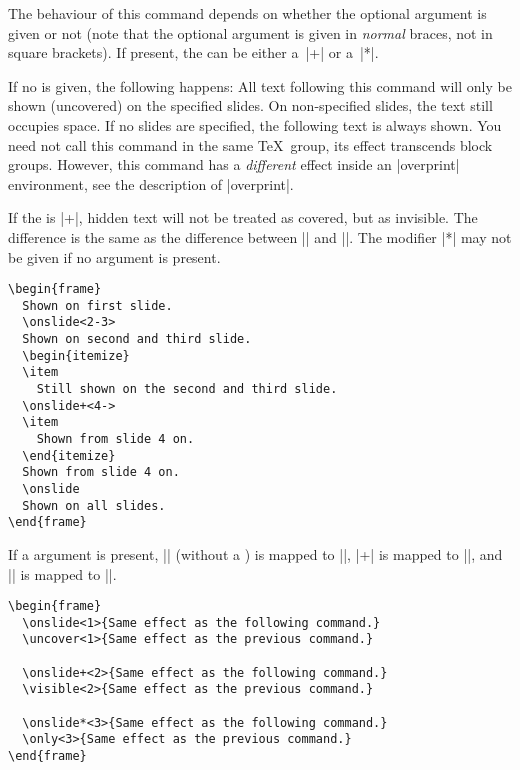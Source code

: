 \begin{command}{\onslide{}}
  The behaviour of this command depends on whether the optional
  argument  is given or not (note that the optional
  argument is given in \emph{normal} braces, not in square
  brackets). If present, the  can be either a~|+| or
  a~|*|.

  If no  is given, the following happens: All text
  following this command will only be shown  (uncovered) on the
  specified slides. On non-specified slides, the text still
  occupies space. If no slides are specified, the following
  text is always shown. You need not call this command in the same
  \TeX\ group, its effect transcends block groups. However, this
  command has a \emph{different} effect inside an |overprint|
  environment, see the description of |overprint|.

  If the  is |+|, hidden text will not be treated
  as covered, but as invisible. The difference is the same as the
  difference between |\uncover| and |\visible|. The modifier |*| may
  not be given if no  argument is present.

  \example
\begin{verbatim}
\begin{frame}
  Shown on first slide.
  \onslide<2-3>
  Shown on second and third slide.
  \begin{itemize}
  \item
    Still shown on the second and third slide.
  \onslide+<4->
  \item
    Shown from slide 4 on.
  \end{itemize}
  Shown from slide 4 on.
  \onslide
  Shown on all slides.
\end{frame}
\end{verbatim}

  If a  argument is present, |\onslide| (without a
  ) is mapped to |\uncover|, |\onslide+|
  is mapped to |\visible|, and |\onslide*| is mapped to |\only|.

  \example
\begin{verbatim}
\begin{frame}
  \onslide<1>{Same effect as the following command.}
  \uncover<1>{Same effect as the previous command.}

  \onslide+<2>{Same effect as the following command.}
  \visible<2>{Same effect as the previous command.}

  \onslide*<3>{Same effect as the following command.}
  \only<3>{Same effect as the previous command.}
\end{frame}
\end{verbatim}
\end{command}


